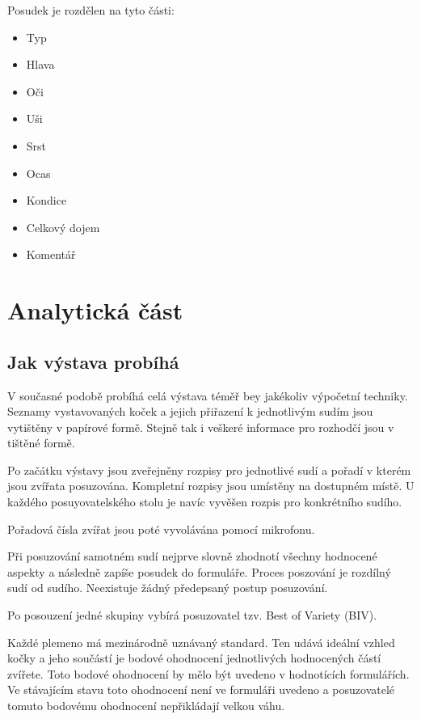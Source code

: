 \documentclass[11pt, oneside]{fithesis2}
\begin{document}
Posudek je rozdělen na tyto části:
\begin{itemize}
\item Typ
\item Hlava
\item Oči
\item Uši
\item Srst
\item Ocas
\item Kondice
\item Celkový dojem 
\item Komentář
\end{itemize}

\chapter{Analytická část}

\section{Jak výstava probíhá}
V současné podobě probíhá celá výstava téměř bey jakékoliv výpočetní techniky. Seznamy vystavovaných koček a jejich přiřazení k jednotlivým sudím jsou vytištěny v papírové formě. Stejně tak i veškeré informace pro rozhodčí jsou
v tištěné formě.

Po začátku výstavy jsou zveřejněny rozpisy pro jednotlivé sudí a pořadí v kterém jsou zvířata posuzována. Kompletní rozpisy jsou umístěny na dostupném místě. U každého posuyovatelského stolu je navíc vyvěšen rozpis pro konkrétního sudího.
\linebreak

Pořadová čísla zvířat jsou poté vyvolávána pomocí mikrofonu.

Při posuzování samotném sudí nejprve slovně zhodnotí všechny hodnocené aspekty a následně zapíše posudek do formuláře.
Proces poszování je rozdílný sudí od sudího. Neexistuje žádný předepsaný postup posuzování.
\linebreak

Po posouzení jedné skupiny vybírá posuzovatel tzv. Best of Variety (BIV).

Každé plemeno má mezinárodně uznávaný standard. Ten udává ideální vzhled kočky a jeho součástí je bodové ohodnocení jednotlivých hodnocených částí zvířete.
Toto bodové ohodnocení by mělo být uvedeno v hodnotících formulářích. Ve stávajícím stavu toto ohodnocení není ve formuláři uvedeno a posuzovatelé tomuto bodovému ohodnocení nepřikládají velkou váhu.
\end{document}
